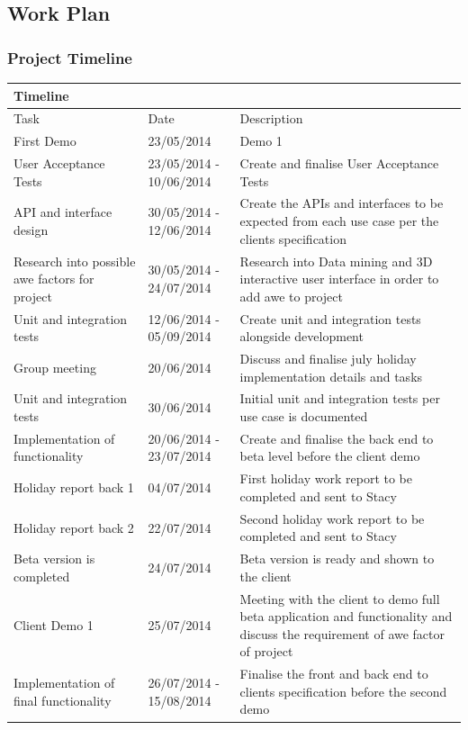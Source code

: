 \documentclass[12pt]{article}
\begin{document}
\subsection{Work Plan}
\subsubsection{Project Timeline}
\begin{center}
\begin{longtable}{|p{3cm}|p{3cm}|p{9cm}|}
\hline
\multicolumn{3}{|l|}{\bf Timeline} \\
\hline
 Task & Date & Description  \\
\hline
First Demo & 23/05/2014 & Demo 1 \\
\hline
User Acceptance Tests & 23/05/2014 - 10/06/2014 & Create and finalise User Acceptance Tests \\
\hline
API and interface design & 30/05/2014 - 12/06/2014 & Create the APIs and interfaces to be expected from each use case per the clients specification\\
\hline
Research into possible awe factors for project & 30/05/2014 - 24/07/2014 & Research into Data mining and 3D interactive user interface in order to add awe to project\\
\hline
Unit and integration tests & 12/06/2014 - 05/09/2014 & Create unit and integration tests alongside development\\
\hline
Group meeting & 20/06/2014 & Discuss and finalise july holiday implementation details and tasks\\
\hline
Unit and integration tests & 30/06/2014 & Initial unit and integration tests per use case is documented\\
\hline
Implementation of functionality & 20/06/2014 - 23/07/2014 & Create and finalise the back end to beta level before the client demo \\
\hline
Holiday report back 1 & 04/07/2014 & First holiday work report to be completed and sent to Stacy\\
\hline
Holiday report back 2 & 22/07/2014 & Second holiday work report to be completed and sent to Stacy\\
\hline
Beta version is completed & 24/07/2014 & Beta version is ready and shown to the client  \\
\hline
Client Demo 1 & 25/07/2014 & Meeting with the client to demo full beta application and functionality and discuss the requirement of awe factor of project\\
\hline
Implementation of final functionality & 26/07/2014 - 15/08/2014 & Finalise the front and back end to clients specification before the second demo \\

\end{longtable}
\end{center}
\end{document}
